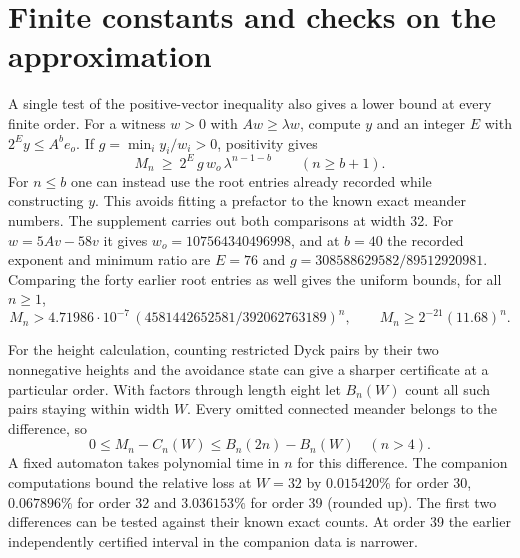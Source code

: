 \documentclass[11pt]{article}
\newcommand{\wnum}{4581442652581}
\newcommand{\wden}{392062763189}
\begin{document}
\section{Finite constants and checks on the approximation}
A single test of the positive-vector inequality also gives a lower bound at every finite order. For a witness \(w>0\) with \(Aw\ge\lambda w\), compute \(y\) and an integer \(E\) with \(2^E y\le A^b e_o\). If \(g=\min_i y_i/w_i>0\), positivity gives
\[
  M_n\ \ge\ 2^E\,g\,w_o\,\lambda^{n-1-b}\qquad(n\ge b+1).
\]
For \(n\le b\) one can instead use the root entries already recorded while constructing \(y\). This avoids fitting a prefactor to the known exact meander numbers. The supplement carries out both comparisons at width 32. For \(w=5Av-58v\) it gives \(w_o=107564340496998\), and at \(b=40\) the recorded exponent and minimum ratio are \(E=76\) and \(g=308588629582/89512920981\). Comparing the forty earlier root entries as well gives the uniform bounds, for all \(n\ge1\),
\[
 M_n>4.71986\cdot 10^{-7}\,(\wnum/\wden)^n,\qquad
 M_n\ge 2^{-21}(11.68)^n.
\]

For the height calculation, counting restricted Dyck pairs by their two nonnegative heights and the avoidance state can give a sharper certificate at a particular order. With factors through length eight let \(B_n(W)\) count all such pairs staying within width \(W\). Every omitted connected meander belongs to the difference, so
\[
 0\le M_n-C_n(W)\le B_n(2n)-B_n(W)\quad(n>4).
\]
A fixed automaton takes polynomial time in \(n\) for this difference. The companion computations bound the relative loss at \(W=32\) by \(0.015420\%\) for order 30, \(0.067896\%\) for order 32 and \(3.036153\%\) for order 39 (rounded up). The first two differences can be tested against their known exact counts. At order 39 the earlier independently certified interval in the companion data is narrower.
\end{document}
